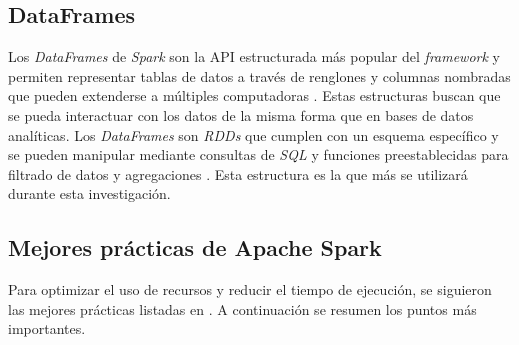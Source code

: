 \subsection{DataFrames}

Los \textit{DataFrames} de \textit{Spark} son la API estructurada más popular del \textit{framework} y permiten representar tablas de datos a través de renglones y columnas nombradas que pueden extenderse a múltiples computadoras \cite{sparkguide}. Estas estructuras buscan que se pueda interactuar con los datos de la misma forma que en bases de datos analíticas. Los \textit{DataFrames} son \textit{RDDs} que cumplen con un esquema específico \cite{sparkberkeley} y se pueden manipular mediante consultas de \textit{SQL} y funciones preestablecidas para filtrado de datos y agregaciones \cite{sparkberkeley}. Esta estructura es la que más se utilizará durante esta investigación.

\subsection{Mejores prácticas de Apache Spark}

Para optimizar el uso de recursos y reducir el tiempo de ejecución, se siguieron las mejores prácticas listadas en \cite{sparkibm}. A continuación se resumen los puntos más importantes.

